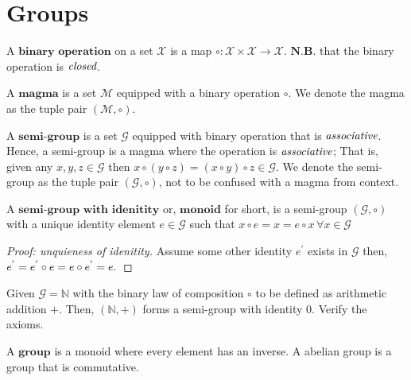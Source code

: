 
\section{Groups} %
\label{sec:groups}

\begin{defn}
 A $\textbf{binary operation}$ on a set $\mathcal{X}$ is a map
 $\circ : \mathcal{X} \times \mathcal{X} \to \mathcal{X}$.
 $\textbf{N.B.}$ that the binary operation is $\emph{closed}$.
\end{defn}

\begin{defn}[Magma]
 A $\textbf{magma}$ is a set $\mathcal{M}$ equipped with a binary operation $\circ$.
 We denote the magma as the tuple pair $(\mathcal{M}, \circ)$.
\end{defn}


\begin{defn}
 A $\textbf{semi-group}$ is a set $\mathcal{G}$ equipped with binary operation that is $\emph{associative}$.
 Hence, a semi-group is a magma where the operation is $\emph{associative}$;
 That is, given any $x,y,z \in \mathcal{G}$ then $x \circ (y \circ z) = (x \circ y) \circ z \in \mathcal{G}$.
 We denote the semi-group as the tuple pair $(\mathcal{G}, \circ)$, not to be confused with a magma from context.
\end{defn}

\begin{defn}[Monoid]
 A $\textbf{semi-group with idenitity}$ or, $\textbf{monoid}$ for short, is a semi-group $(\mathcal{G}, \circ)$
 with a unique identity element $e \in \mathcal{G}$ such that $x \circ e = x = e \circ x \, \forall x \in \mathcal{G}$
\end{defn}


\begin{proof}[Proof: unquieness of idenitity]
 Assume some other identity $e^{'}$ exists in $\mathcal{G}$ then, $e^{'} = e^{'} \circ e = e \circ e^{'} = e. \qedhere$
\end{proof}


\begin{exmp}
 Given $\mathcal{G} = \mathbb{N}$ with the binary law of composition $\circ$ to be defined as arithmetic addition $+$.
 Then, $(\mathbb{N}, +)$ forms a semi-group with identity $0$. Verify the axioms.
\end{exmp}


\begin{defn}[Group]
 A $\textbf{group}$ is a monoid where every element has an inverse. A abelian group is a group that is commutative.
\end{defn}

